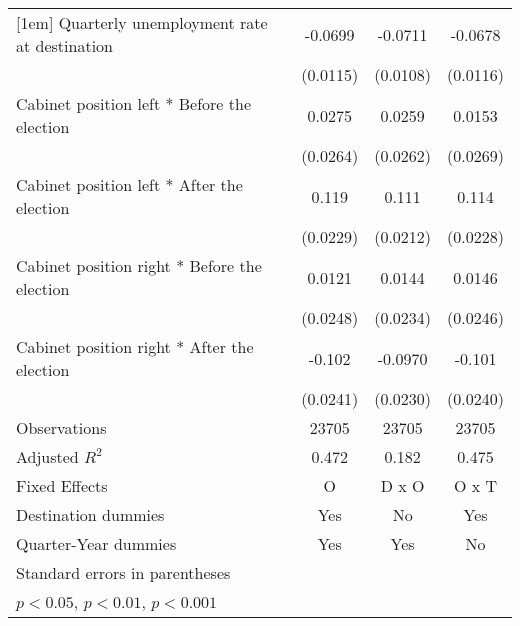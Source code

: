 \begin{table}[htbp]
\begin{tabular}{l*{3}{c}}
[1em]
Quarterly unemployment rate at destination&     -0.0699\sym{***}&     -0.0711\sym{***}&     -0.0678\sym{***}\\
                    &    (0.0115)         &    (0.0108)         &    (0.0116)         \\
[1em]
Cabinet position left * Before the election&      0.0275         &      0.0259         &      0.0153         \\
                    &    (0.0264)         &    (0.0262)         &    (0.0269)         \\
[1em]
Cabinet position left * After the election&       0.119\sym{***}&       0.111\sym{***}&       0.114\sym{***}\\
                    &    (0.0229)         &    (0.0212)         &    (0.0228)         \\
[1em]
Cabinet position right * Before the election&      0.0121         &      0.0144         &      0.0146         \\
                    &    (0.0248)         &    (0.0234)         &    (0.0246)         \\
[1em]
Cabinet position right * After the election&      -0.102\sym{***}&     -0.0970\sym{***}&      -0.101\sym{***}\\
                    &    (0.0241)         &    (0.0230)         &    (0.0240)         \\
\hline
Observations        &       23705         &       23705         &       23705         \\
Adjusted \(R^{2}\)  &       0.472         &       0.182         &       0.475         \\
Fixed Effects       &           O         &       D x O         &       O x T         \\
Destination dummies &         Yes         &          No         &         Yes         \\
Quarter-Year dummies&         Yes         &         Yes         &          No         \\
\hline\hline
\multicolumn{4}{l}{\footnotesize Standard errors in parentheses}\\
\multicolumn{4}{l}{\footnotesize \sym{*} \(p<0.05\), \sym{**} \(p<0.01\), \sym{***} \(p<0.001\)}\\
\end{tabular}
\end{table}
